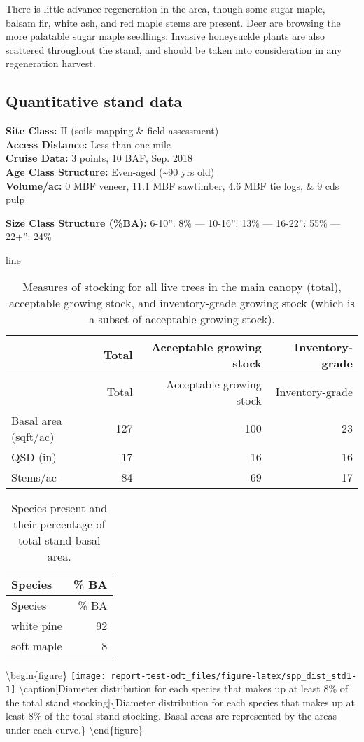 \documentclass[]{tufte-handout}
\begin{document}
There is little advance regeneration in the area, though some sugar
maple, balsam fir, white ash, and red maple stems are present. Deer are
browsing the more palatable sugar maple seedlings. Invasive honeysuckle
plants are also scattered throughout the stand, and should be taken into
consideration in any regeneration harvest.

\subsection{Quantitative stand data}\label{quantitative-stand-data}

\textbf{Site Class: } II (soils mapping \& field assessment)\\
\textbf{Access Distance: } Less than one mile\\
\textbf{Cruise Data: } 3 points, 10 BAF, Sep. 2018\\
\textbf{Age Class Structure: } Even-aged (\textasciitilde{}90 yrs old)\\
\textbf{Volume/ac: } 0 MBF veneer, 11.1 MBF sawtimber, 4.6 MBF tie logs,
\& 9 cds pulp

\textbf{Size Class Structure (\%BA): } 6-10'': 8\% --- 10-16'': 13\% ---
16-22'': 55\% --- 22+'': 24\%

line

\begin{longtable}[]{@{}lrrr@{}}
\caption{Measures of stocking for all live trees in the main canopy
(total), acceptable growing stock, and inventory-grade growing stock
(which is a subset of acceptable growing stock).}\tabularnewline
\toprule
& Total & Acceptable growing stock & Inventory-grade\tabularnewline
\midrule
\endfirsthead
\toprule
& Total & Acceptable growing stock & Inventory-grade\tabularnewline
\midrule
\endhead
Basal area (sqft/ac) & 127 & 100 & 23\tabularnewline
QSD (in) & 17 & 16 & 16\tabularnewline
Stems/ac & 84 & 69 & 17\tabularnewline
\bottomrule
\end{longtable}

\begin{longtable}[]{@{}lr@{}}
\caption{Species present and their percentage of total stand basal
area.}\tabularnewline
\toprule
Species & \% BA\tabularnewline
\midrule
\endfirsthead
\toprule
Species & \% BA\tabularnewline
\midrule
\endhead
white pine & 92\tabularnewline
soft maple & 8\tabularnewline
\bottomrule
\end{longtable}

\textbackslash{}begin\{figure\}
\texttt{[image: report-test-odt\_files/figure-latex/spp\_dist\_std1-1]}
\textbackslash{}caption{[}Diameter distribution for each species that
makes up at least 8\% of the total stand stocking{]}\{Diameter
distribution for each species that makes up at least 8\% of the total
stand stocking. Basal areas are represented by the areas under each
curve.\}\label{fig:spp_dist_std1} \textbackslash{}end\{figure\}
\end{document}
